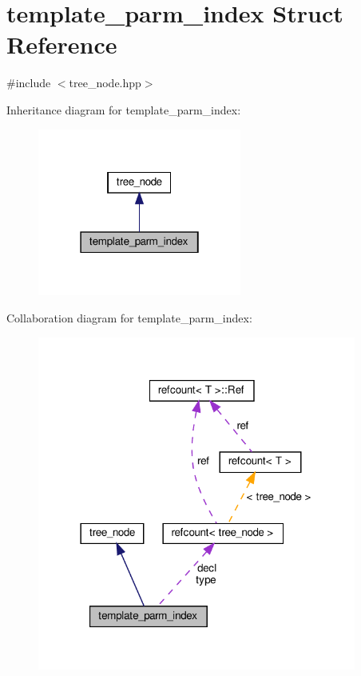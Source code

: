 \hypertarget{structtemplate__parm__index}{}\section{template\+\_\+parm\+\_\+index Struct Reference}
\label{structtemplate__parm__index}


{\ttfamily \#include $<$tree\+\_\+node.\+hpp$>$}



Inheritance diagram for template\+\_\+parm\+\_\+index\+:
\nopagebreak
\begin{figure}[H]
\begin{center}
\leavevmode
\includegraphics[width=190pt]{d4/dfc/structtemplate__parm__index__inherit__graph}
\end{center}
\end{figure}


Collaboration diagram for template\+\_\+parm\+\_\+index\+:
\nopagebreak
\begin{figure}[H]
\begin{center}
\leavevmode
\includegraphics[width=297pt]{db/d43/structtemplate__parm__index__coll__graph}
\end{center}
\end{figure}
